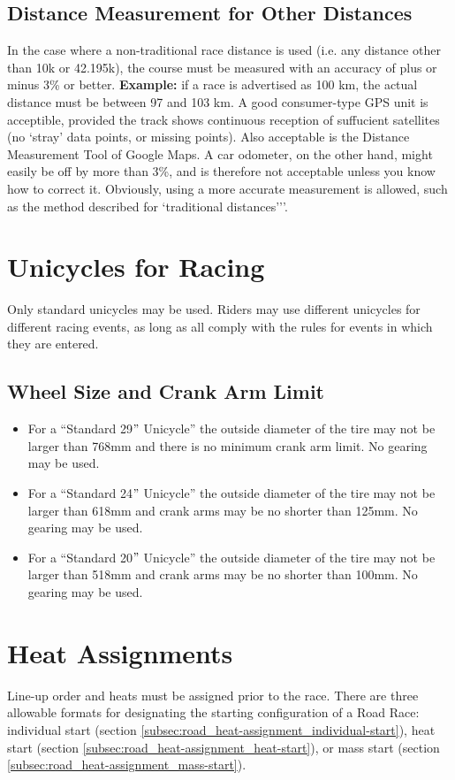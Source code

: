 \subsection {Distance Measurement for Other Distances}
In the case where a non-traditional race distance is used (i.e. any distance other than 10k or 42.195k), the course must be measured with an accuracy of plus or minus 3\% or better.
\textbf{Example:} if a race is advertised as 100 km, the actual distance must be between 97 and 103 km.
A good consumer-type GPS unit is acceptible, provided the track shows continuous reception of suffucient satellites (no `stray' data points, or missing points).
Also acceptable is the Distance Measurement Tool of Google Maps.
A car odometer, on the other hand, might easily be off by more than 3\%, and is therefore not acceptable unless you know how to correct it.
Obviously, using a more accurate measurement is allowed, such as the method described for `traditional distances'’'.

\section{Unicycles for Racing}
Only standard unicycles may be used.
Riders may use different unicycles for different racing events, as long as all comply with the rules for events in which they are entered.
\subsection{Wheel Size and Crank Arm Limit}
\begin{itemize}
\item For a ``Standard 29$"$ Unicycle'' the outside diameter of the tire may not be larger than 768mm and there is no minimum crank arm limit.
No gearing may be used.
\item For a ``Standard 24$"$ Unicycle'' the outside diameter of the tire may not be larger than 618mm and crank arms may be no shorter than 125mm.
No gearing may be used.
\item For a ``Standard 20$"$ Unicycle'' the outside diameter of the tire may not be larger than 518mm and crank arms may be no shorter than 100mm.
No gearing may be used.
\end{itemize}

\section{Heat Assignments}
Line-up order and heats must be assigned prior to the race.
There are three allowable formats for designating the starting configuration of a Road Race: individual start (section \ref{subsec:road_heat-assignment_individual-start}), heat start (section \ref{subsec:road_heat-assignment_heat-start}), or mass start (section \ref{subsec:road_heat-assignment_mass-start}).

